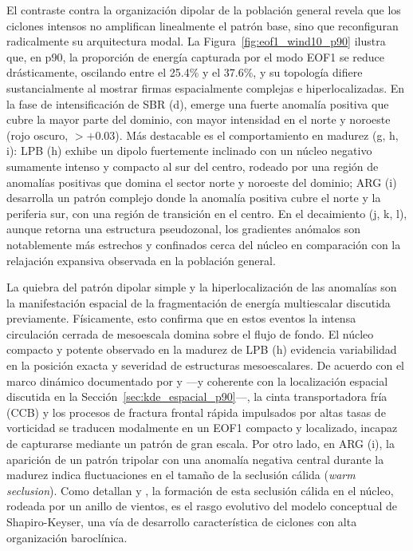 El contraste contra la organización dipolar de la población general revela que los ciclones intensos no amplifican linealmente el patrón base, sino que reconfiguran radicalmente su arquitectura modal. 
La Figura~\ref{fig:eof1_wind10_p90} ilustra que, en p90, la proporción de energía capturada por el modo EOF1 se reduce drásticamente, oscilando entre el 25.4\% y el 37.6\%, y su topología difiere sustancialmente al mostrar firmas espacialmente complejas e hiperlocalizadas. 
En la fase de intensificación de SBR (d), emerge una fuerte anomalía positiva que cubre la mayor parte del dominio, con mayor intensidad en el norte y noroeste (rojo oscuro, $>+0.03$). 
Más destacable es el comportamiento en madurez (g, h, i): LPB (h) exhibe un dipolo fuertemente inclinado con un núcleo negativo sumamente intenso y compacto al sur del centro, rodeado por una región de anomalías positivas que domina el sector norte y noroeste del dominio; ARG (i) desarrolla un patrón complejo donde la anomalía positiva cubre el norte y la periferia sur, con una región de transición en el centro. 
En el decaimiento (j, k, l), aunque retorna una estructura pseudozonal, los gradientes anómalos son notablemente más estrechos y confinados cerca del núcleo en comparación con la relajación expansiva observada en la población general.

La quiebra del patrón dipolar simple y la hiperlocalización de las anomalías son la manifestación espacial de la fragmentación de energía multiescalar discutida previamente.
Físicamente, esto confirma que en estos eventos la intensa circulación cerrada de mesoescala domina sobre el flujo de fondo. 
El núcleo compacto y potente observado en la madurez de LPB (h) evidencia variabilidad en la posición exacta y severidad de estructuras mesoescalares. 
De acuerdo con el marco dinámico documentado por \citet{clark2005sting} y \citet{han2025system} —y coherente con la localización espacial discutida en la Sección~\ref{sec:kde_espacial_p90}—, la cinta transportadora fría (CCB) y los procesos de fractura frontal rápida impulsados por altas tasas de vorticidad se traducen modalmente en un EOF1 compacto y localizado, incapaz de capturarse mediante un patrón de gran escala. 
Por otro lado, en ARG (i), la aparición de un patrón tripolar con una anomalía negativa central durante la madurez indica fluctuaciones en el tamaño de la seclusión cálida (\textit{warm seclusion}). 
Como detallan \citet{schultz2021antecedents} y \citet{reboita2022from}, la formación de esta seclusión cálida en el núcleo, rodeada por un anillo de vientos, es el rasgo evolutivo del modelo conceptual de Shapiro-Keyser, una vía de desarrollo característica de ciclones con alta organización baroclínica.

